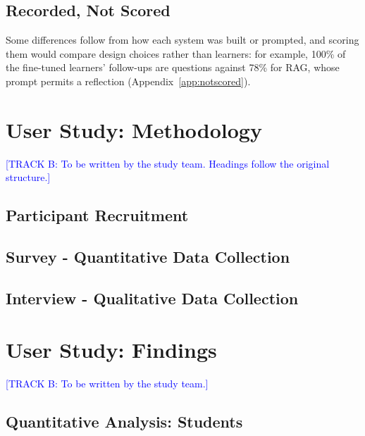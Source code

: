 \documentclass[pdflatex,sn-mathphys-num]{sn-jnl}%
\newcommand{\trackb}[1]{\textcolor{blue}{[TRACK B: #1]}}
\theoremstyle{thmstyleone}%
\theoremstyle{thmstyletwo}%
\theoremstyle{thmstylethree}%
\begin{document}
\subsection{Recorded, Not Scored}\label{sec:res-notscored}

Some differences follow from how each system was built or prompted, and scoring them would compare
design choices rather than learners: for example, 100\% of the fine-tuned learners' follow-ups are
questions against 78\% for RAG, whose prompt permits a reflection (Appendix~\ref{app:notscored}).
\section{User Study: Methodology}\label{sec:study-method}

\trackb{To be written by the study team. Headings follow the original structure.}

\subsection{Participant Recruitment}

\subsection{Survey - Quantitative Data Collection}

\subsection{Interview - Qualitative Data Collection}

\section{User Study: Findings}\label{sec:study-findings}

\trackb{To be written by the study team.}

\subsection{Quantitative Analysis: Students}
\end{document}
